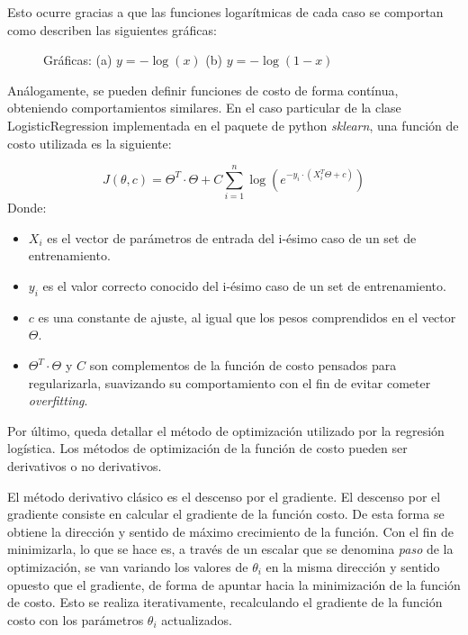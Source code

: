 Esto ocurre gracias a que las funciones logarítmicas de cada caso se comportan como describen las siguientes gráficas:

\begin{figure}[H]
\centering
{}
 \caption{Gráficas:  (a)  \hspace{0.1cm} $y = - \log (x)$  \hspace{0.2cm} (b) \hspace{0.1cm} $y = - \log (1-x)$}
 \label{fig:logCurves}
\end{figure}

Análogamente, se pueden definir funciones de costo de forma contínua, obteniendo comportamientos similares. En el caso particular de la clase LogisticRegression implementada en el paquete de python \textit{sklearn}, una función de costo utilizada es la siguiente:

\begin{equation}
J(\theta,c)= \Theta^T \cdot \Theta + C \sum_{i=1}^n \log (e^{-y_{i} \cdot (X_{i}^T \Theta + c)})
\end{equation}
Donde:

\begin{itemize}
  \item $X_{i}$ es el vector de parámetros de entrada del i-ésimo caso de un set de entrenamiento.
  \item $y_{i}$ es el valor correcto conocido del i-ésimo caso de un set de entrenamiento.
  \item $c$ es una constante de ajuste, al igual que los pesos comprendidos en el vector $\Theta$. 
  \item $\Theta^T \cdot \Theta$ y $C$ son complementos de la función de costo pensados para regularizarla, suavizando su comportamiento con el fin de evitar cometer \textit{overfitting}.
\end{itemize}

Por último, queda detallar el método de optimización utilizado por la regresión logística. Los métodos de optimización de la función de costo pueden ser derivativos o no derivativos.

El método derivativo clásico es el descenso por el gradiente. El descenso por el gradiente consiste en calcular el gradiente de la función costo. De esta forma se obtiene la dirección y sentido de máximo crecimiento de la función. Con el fin de minimizarla, lo que se hace es, a través de un escalar que se denomina \textit{paso} de la optimización, se van variando los valores de $\theta_{i}$ en la misma dirección y sentido opuesto que el gradiente, de forma de apuntar hacia la minimización de la función de costo. Esto se realiza iterativamente, recalculando el gradiente de la función costo con los parámetros $\theta_{i}$ actualizados.

